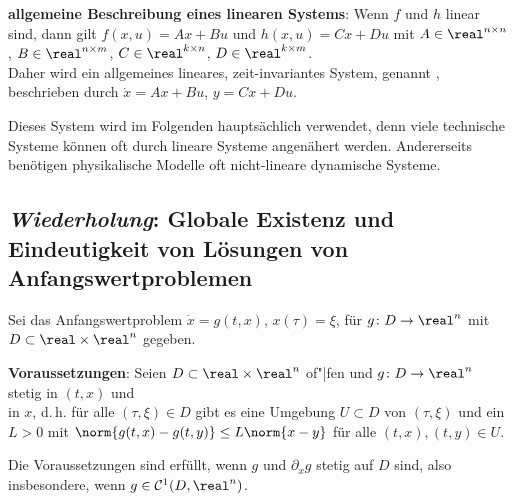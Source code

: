 \linie

\textbf{allgemeine Beschreibung eines linearen Systems}:
Wenn $f$ und $h$ linear sind, dann gilt
$f(x, u) = Ax + Bu$ und $h(x, u) = Cx + Du$
mit $A \in \real^{n \times n}$, $B \in \real^{n \times m}$, $C \in \real^{k \times n}$,
$D \in \real^{k \times m}$.\\
Daher wird ein allgemeines lineares, zeit-invariantes System,
genannt , beschrieben durch
$\dot{x} = Ax + Bu$, $y = Cx + Du$.

Dieses System wird im Folgenden hauptsächlich verwendet,
denn viele technische Systeme können oft durch lineare Systeme angenähert werden.
Andererseits benötigen physikalische Modelle oft nicht-lineare dynamische Systeme.

\pagebreak

\subsection{%
    \emph{Wiederholung}: Globale Existenz und Eindeutigkeit von Lösungen von Anfangswertproblemen%
}

Sei das Anfangswertproblem $\dot{x} = g(t, x)$, $x(\tau) = \xi$,
für $g\colon D \rightarrow \real^n$ mit $D \subset \real \times \real^n$ gegeben.

\textbf{Voraussetzungen}:
Seien $D \subset \real \times \real^n$ of"|fen und $g\colon D \rightarrow \real^n$
stetig in $(t, x)$ und\\
 in $x$, d.\,h.
für alle $(\tau, \xi) \in D$ gibt es eine Umgebung $U \subset D$ von $(\tau, \xi)$
und ein $L > 0$ mit
$\norm{g(t, x) - g(t, y)} \le L \norm{x - y}$ für alle $(t, x), (t, y) \in U$.

Die Voraussetzungen sind erfüllt, wenn $g$ und $\partial_x g$ stetig auf $D$ sind,
also insbesondere, wenn $g \in \C^1(D, \real^n)$.

\linie


